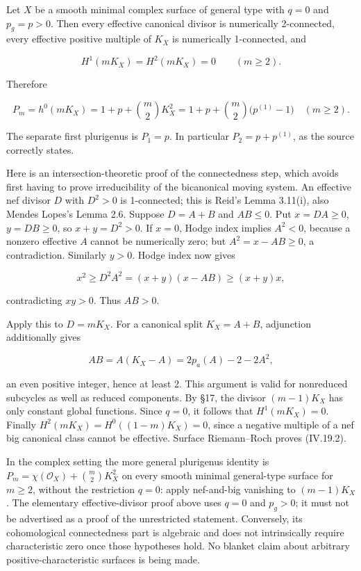 Let \(X\) be a smooth minimal complex surface of general type with \(q=0\) and \(p_g=p>0\). Then every effective canonical divisor is numerically 2-connected, every effective positive multiple of \(K_X\) is numerically 1-connected, and

\[
H^1(mK_X)=H^2(mK_X)=0\qquad(m\ge2).
\tag{IV.19.1}
\]

Therefore

\[
\boxed{P_m=h^0(mK_X)=1+p+\binom m2K_X^2
=1+p+\binom m2\bigl(p^{(1)}-1\bigr)\quad(m\ge2).}
\tag{IV.19.2}
\]

The separate first plurigenus is \(P_1=p\). In particular \(P_2=p+p^{(1)}\), as the source correctly states.

Here is an intersection-theoretic proof of the connectedness step, which avoids first having to prove irreducibility of the bicanonical moving system. An effective nef divisor \(D\) with \(D^2>0\) is 1-connected; this is Reid's Lemma 3.11(i), also Mendes Lopes's Lemma 2.6. Suppose \(D=A+B\) and \(AB\le 0\). Put \(x=DA\ge 0\), \(y=DB\ge 0\), so \(x+y=D^2>0\). If \(x=0\), Hodge index implies \(A^2<0\), because a nonzero effective \(A\) cannot be numerically zero; but \(A^2=x-AB\ge 0\), a contradiction. Similarly \(y>0\). Hodge index now gives

\[
x^2\ge D^2A^2=(x+y)(x-AB)\ge(x+y)x,
\]

contradicting \(xy>0\). Thus \(AB>0\).

Apply this to \(D=m K_X\). For a canonical split \(K_X=A+B\), adjunction additionally gives

\[
AB=A(K_X-A)=2p_a(A)-2-2A^2,
\]

an even positive integer, hence at least 2. This argument is valid for nonreduced subcycles as well as reduced components. By §17, the divisor \((m-1)K_X\) has only constant global functions. Since \(q=0\), it follows that \(H^1(m K_X)=0\). Finally \(H^2(m K_X)=H^0((1-m)K_X)=0\), since a negative multiple of a nef big canonical class cannot be effective. Surface Riemann--Roch proves (IV.19.2).

In the complex setting the more general plurigenus identity is \(P_m=\chi(\mathcal O_X)+\binom m 2 K_X^2\) on every smooth minimal general-type surface for \(m\ge 2\), without the restriction \(q=0\): apply nef-and-big vanishing to \((m-1)K_X\). The elementary effective-divisor proof above uses \(q=0\) and \(p_g>0\); it must not be advertised as a proof of the unrestricted statement. Conversely, its cohomological connectedness part is algebraic and does not intrinsically require characteristic zero once those hypotheses hold. No blanket claim about arbitrary positive-characteristic surfaces is being made.


